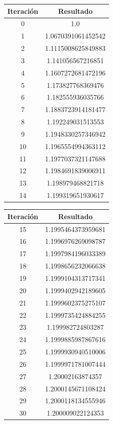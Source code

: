 \documentclass[titlepage,a4paper]{article}
\begin{document}
\begin{multicols}{2}
\begin{center}
    \begin{tabular}{| c | c |}
    \hline
     Iteración & Resultado \\ \hline
     0     &  1.0 \\
1     &  1.0670391061452542 \\
2     &  1.1115008625849883 \\
3     &  1.141056567216851 \\
4     &  1.1607272681472196 \\
5     &  1.173827768369476 \\
6     &  1.182555936035766 \\
7     &  1.1883723914181477 \\
8     &  1.192249031513553 \\
9     &  1.1948330257346942 \\
10     &  1.1965554994363112 \\
11     &  1.1977037321147688 \\
12     &  1.1984691839006911 \\
13     &  1.198979468821718 \\
14     &  1.199319651930617 \\

          \hline
    \end{tabular}
\end{center}
        
    \begin{center}
    \begin{tabular}{| c | c |}
    \hline    
     Iteración & Resultado \\ \hline
   15     &  1.1995464373959681 \\
16     &  1.1996976269098787 \\
17     &  1.1997984196033389 \\
18     &  1.1998656232066638 \\
19     &  1.1999104313717341 \\
20     &  1.1999402942189605 \\
21     &  1.1999602375275107 \\
22     &  1.1999735424884255 \\
23     &  1.199982724803287 \\
24     &  1.1999885987867616 \\
25     &  1.1999930940510006 \\
26     &  1.1999971781007444 \\
27     &  1.20002163874357 \\
28     &  1.2000145671108424 \\
29     &  1.2000118134555946 \\
30     &  1.200009022124353 \\
    \hline
    \end{tabular}
\end{center}
\end{multicols}
\end{document}
